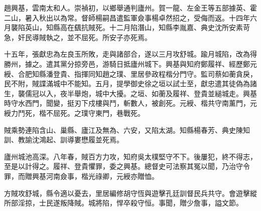 \begin{pinyinscope}
趙興基，雲南太和人。崇禎初，以鄉舉通判廬州。賀一龍、左金王等五部據英、霍二山，暑入秋出以為常。督師楊嗣昌遣監軍僉事楊卓然招之，受侮而返。十四年六月襲陷英山，知縣高在颻抗賊死。十二月陷潛山，知縣李胤嘉、典史沈所安素苛急，奸民導賊執之，並不屈死。所安子亦死焉。

十五年，張獻忠為左良玉所敗，走與諸部合，遂以三月攻舒城。踰月城陷，改為得勝州，據之。遣其黨分掠旁邑，游騎日抵廬州城下。興基與知府鄭履祥、經歷鄭元綬、合肥知縣潘登貴、指揮同知趙之璞、里居參政程楷分門守。監司蔡如蘅貪戾，民不附，賊諜滿城中不能知。五月，提學御史徐之垣以試士至，獻忠遣其徒偽為諸生，襲儒冠以入，夜半舉炮，城中大擾。之垣、如蘅及履祥、登貴並縋城走。興基時守水西門，聞變，挺刃下戍樓與鬥，斬數人，被創死。元綬、楷共守南薰門，元綬力鬥死，楷不屈死。之璞守東門，巷戰死。

賊乘勢連陷含山、巢縣、廬江及無為、六安，又陷太湖。知縣楊春芳、典史陳知訓、教諭沈鴻起、訓導婁懋履並死焉。

廬州城池高深。八年春，賊百方力攻，知府吳太樸堅守不下。後屢犯，終不得志，至是以計得之。履祥、登貴懼罪，委之興基。總督史可法察其冤以聞，乃治守令罪，而贈興基河南僉事，楷光祿卿，元綬亦贈恤。

方賊攻舒城，縣令適以憂去，里居編修胡守恆與遊擊孔廷訓督民兵共守。會遊擊縱所部淫掠，士民遂叛降賊。城將陷，悍卒殺守恒。事聞，贈少詹事，謚文節。


\end{pinyinscope}
